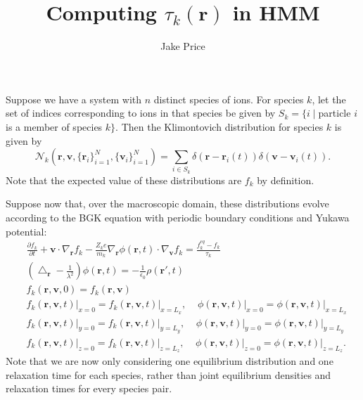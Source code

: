 \documentclass{article}
\title{Computing $\tau_{k}(\mathbf{r})$ in HMM}
\author{Jake Price}
\begin{document}
\maketitle




Suppose we have a system with $n$ distinct species of ions. For species $k$, let the set of indices corresponding to ions in that species be given by $S_k=\{i\;|\;$particle $i$ is a member of species $k\}$. Then the Klimontovich distribution for species $k$ is given by
\begin{equation}
\mathcal{N}_k(\mathbf{r},\mathbf{v},\{\mathbf{r}_i\}_{i=1}^N,\{\mathbf{v}_i\}_{i=1}^N)=\sum_{i\in S_k}\delta(\mathbf{r}-\mathbf{r}_i(t))\delta(\mathbf{v}-\mathbf{v}_i(t)).
\end{equation}Note that the expected value of these distributions are $f_k$ by definition.

Suppose now that, over the macroscopic domain, these distributions evolve according to the BGK equation with periodic boundary conditions and Yukawa potential:
\begin{equation}
\begin{split}
&\frac{\partial f_k}{\partial t}+\mathbf{v}\cdot\nabla_\mathbf{r}f_k-\frac{Z_ke}{m_k}\nabla_\mathbf{r}\phi(\mathbf{r},t)\cdot\nabla_\mathbf{v}f_k=\frac{f_{k}^{eq}-f_k}{\tau_{k}}\\
&\left(\bigtriangleup_\mathbf{r}-\frac{1}{\lambda^2}\right)\phi(\mathbf{r},t)=-\frac{1}{\epsilon_0}\rho(\mathbf{r}',t)\\
&f_k(\mathbf{r},\mathbf{v},0)=f_{k}(\mathbf{r},\mathbf{v})\\
&\left.f_k(\mathbf{r},\mathbf{v},t)\right|_{x=0}=\left.f_{k}(\mathbf{r},\mathbf{v},t)\right|_{x=L_x},\;\;\;\;
\left.\phi(\mathbf{r},\mathbf{v},t)\right|_{x=0}=\left.\phi(\mathbf{r},\mathbf{v},t)\right|_{x=L_x}\\
&\left.f_k(\mathbf{r},\mathbf{v},t)\right|_{y=0}=\left.f_{k}(\mathbf{r},\mathbf{v},t)\right|_{y=L_y},\;\;\;\;
\left.\phi(\mathbf{r},\mathbf{v},t)\right|_{y=0}=\left.\phi(\mathbf{r},\mathbf{v},t)\right|_{y=L_y}\\
&\left.f_k(\mathbf{r},\mathbf{v},t)\right|_{z=0}=\left.f_{k}(\mathbf{r},\mathbf{v},t)\right|_{z=L_z},\;\;\;\;
\left.\phi(\mathbf{r},\mathbf{v},t)\right|_{z=0}=\left.\phi(\mathbf{r},\mathbf{v},t)\right|_{z=L_z}.
\end{split}
\label{eq:BGK}
\end{equation}
Note that we are now only considering one equilibrium distribution and one relaxation time for each species, rather than joint equilibrium densities and relaxation times for every species pair. 
\end{document}

